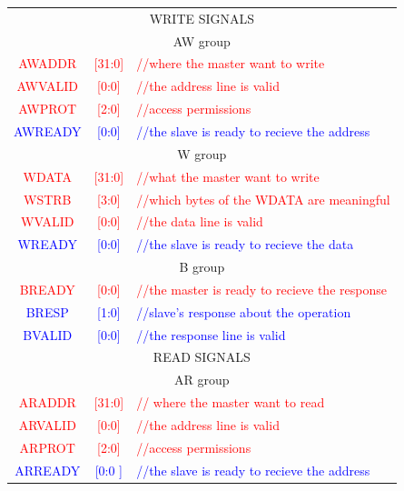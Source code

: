 \begin{tabular} {c c l}
  \hline
  \multicolumn{3}{c}{\Large{WRITE SIGNALS}} \\

  \multicolumn{3}{c}{{AW group}} \\
  \textcolor{Red}{\small{AWADDR}} & \textcolor{Red}{\small{[31:0]}} & \textcolor{Red}{\small{//where the master want to write}} \\
  \textcolor{Red}{\small{AWVALID}} & \textcolor{Red}{\small{[0:0]}} & \textcolor{Red}{\small{//the address line is valid}} \\
  \textcolor{Red}{\small{AWPROT}} & \textcolor{Red}{\small{[2:0]}} & \textcolor{Red}{\small{//access permissions}} \\
  \textcolor{Blue}{\small{AWREADY}} & \textcolor{Blue}{\small{[0:0]}} & \textcolor{Blue}{\small{//the slave is ready to recieve the address}} \\

  \multicolumn{3}{c}{{W group}} \\
  \textcolor{Red}{\small{WDATA}} & \textcolor{Red}{\small{[31:0]}} & \textcolor{Red}{\small{//what the master want to write}} \\
  \textcolor{Red}{\small{WSTRB}} & \textcolor{Red}{\small{[3:0]}} & \textcolor{Red}{\small{//which bytes of the WDATA are meaningful}} \\
  \textcolor{Red}{\small{WVALID}} & \textcolor{Red}{\small{[0:0]}} & \textcolor{Red}{\small{//the data line is valid}} \\
  \textcolor{Blue}{\small{WREADY}} & \textcolor{Blue}{\small{[0:0]}} & \textcolor{Blue}{\small{//the slave is ready to recieve the data}} \\

  \multicolumn{3}{c}{{B group}} \\
  \textcolor{Red}{\small{BREADY}} & \textcolor{Red}{\small{[0:0]}} & \textcolor{Red}{\small{//the master is ready to recieve the response}} \\
  \textcolor{Blue}{\small{BRESP}} & \textcolor{Blue}{\small{[1:0]}} & \textcolor{Blue}{\small{//slave’s response about the operation}} \\
  \textcolor{Blue}{\small{BVALID}} & \textcolor{Blue}{\small{[0:0]}} & \textcolor{Blue}{\small{//the response line is valid}} \\

  \hline
  \multicolumn{3}{c}{\Large{READ SIGNALS}} \\

  \multicolumn{3}{c}{{AR group}} \\
  \textcolor{Red}{\small{ARADDR}} & \textcolor{Red}{\small{[31:0]}} & \textcolor{Red}{\small{// where the master want to read}} \\
  \textcolor{Red}{\small{ARVALID}} & \textcolor{Red}{\small{[0:0]}} & \textcolor{Red}{\small{//the address line is valid}} \\
  \textcolor{Red}{\small{ARPROT}} & \textcolor{Red}{\small{[2:0]}} & \textcolor{Red}{\small{//access permissions}} \\
  \textcolor{Blue}{\small{ARREADY}} & \textcolor{Blue}{\small{[0:0 ]}} & \textcolor{Blue}{\small{//the slave is ready to recieve the address}} \\


\end{tabular}
